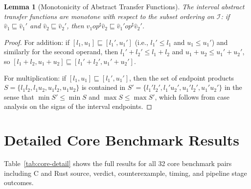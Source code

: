 \documentclass[11pt,a4paper]{article}
\newtheorem{lemma}[theorem]{Lemma}
\begin{document}
\begin{appendices}
\begin{lemma}[Monotonicity of Abstract Transfer Functions]\label{lem:abs-mono}
The interval abstract transfer functions are monotone with respect to
the subset ordering on $\mathcal{I}$:
if $\hat{v}_1 \sqsubseteq \hat{v}_1'$ and
$\hat{v}_2 \sqsubseteq \hat{v}_2'$, then
$\hat{v}_1 \mathbin{op}^{\sharp} \hat{v}_2 \sqsubseteq
\hat{v}_1' \mathbin{op}^{\sharp} \hat{v}_2'$.
\end{lemma}

\begin{proof}
For addition: if $[l_1, u_1] \sqsubseteq [l_1', u_1']$ (i.e.,
$l_1' \leq l_1$ and $u_1 \leq u_1'$) and similarly for the second operand,
then $l_1' + l_2' \leq l_1 + l_2$ and $u_1 + u_2 \leq u_1' + u_2'$,
so $[l_1 + l_2, u_1 + u_2] \sqsubseteq [l_1' + l_2', u_1' + u_2']$.

For multiplication: if $[l_1, u_1] \sqsubseteq [l_1', u_1']$, then the
set of endpoint products $S = \{l_1 l_2, l_1 u_2, u_1 l_2, u_1 u_2\}$
is contained in $S' = \{l_1' l_2', l_1' u_2', u_1' l_2', u_1' u_2'\}$
in the sense that $\min S' \leq \min S$ and $\max S \leq \max S'$,
which follows from case analysis on the signs of the interval endpoints.
\end{proof}


\section{Detailed Core Benchmark Results}\label{app:core-detailed}

Table~\ref{tab:core-detail} shows the full results for all 32 core
benchmark pairs including C and Rust source, verdict, counterexample,
timing, and pipeline stage outcomes.


\end{appendices}
\end{document}
